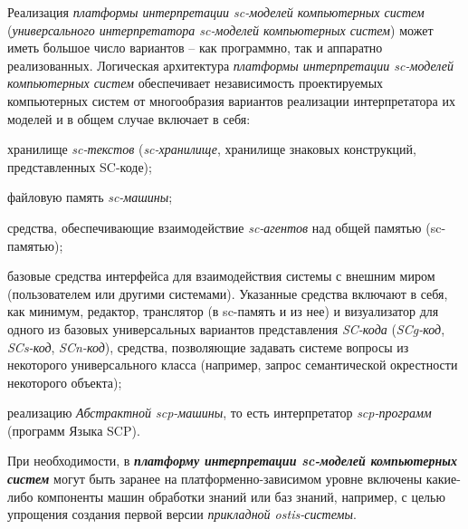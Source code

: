 \begin{SCn}
{Реализация \textit{платформы интерпретации sc-моделей компьютерных систем} (\textit{универсального интерпретатора sc-моделей компьютерных систем}) может иметь большое число вариантов -- как программно, так и аппаратно реализованных. Логическая архитектура \textit{платформы интерпретации sc-моделей компьютерных систем} обеспечивает независимость проектируемых компьютерных систем от многообразия вариантов реализации интерпретатора их моделей и в общем случае включает в себя:

\begin{scnitemize}
    \item хранилище \textit{sc-текстов} (\textit{sc-хранилище}, хранилище знаковых конструкций, представленных SC-коде);
    \item файловую память \textit{sc-машины};
    \item средства, обеспечивающие взаимодействие \textit{sc-агентов} над общей памятью (sc-памятью);
    \item базовые средства интерфейса для взаимодействия системы с внешним миром (пользователем или другими системами). Указанные средства включают в себя, как минимум, редактор, транслятор (в sc-память и из нее) и визуализатор для одного из базовых универсальных вариантов представления \textit{SC-кода} (\textit{SCg-код}, \textit{SCs-код}, \textit{SCn-код}), средства, позволяющие задавать системе вопросы из некоторого универсального класса (например, запрос семантической окрестности некоторого объекта);
    \item реализацию \textit{Абстрактной scp-машины}, то есть интерпретатор \textit{scp-программ} (программ Языка SCP).
\end{scnitemize}
При необходимости, в \textbf{\textit{платформу интерпретации sc-моделей компьютерных систем}} могут быть заранее на платформенно-зависимом уровне включены какие-либо компоненты машин обработки знаний или баз знаний, например, с целью упрощения создания первой версии \textit{прикладной ostis-системы}.

}
\end{SCn}
